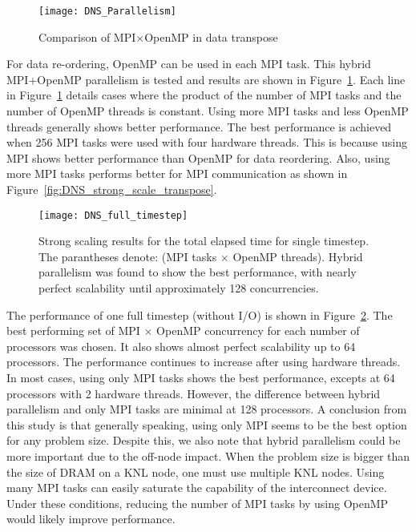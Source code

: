 \begin{figure}
 \begin{center}
   \texttt{[image: DNS\_Parallelism]}
   \caption{Comparison of MPI$\times$OpenMP in data transpose}
   \label{fig:DNS_MPI_OpenMP}
 \end{center}
\end{figure}


For data re-ordering, OpenMP can be used in each MPI task. This hybrid MPI+OpenMP parallelism
is tested and results are shown in Figure~\ref{fig:DNS_MPI_OpenMP}.
Each line in Figure~\ref{fig:DNS_MPI_OpenMP} details cases where the product of
the number of MPI tasks and the number of OpenMP threads is
constant. Using more MPI tasks and less OpenMP threads generally shows
better performance. The best performance is achieved when 256 MPI tasks
were used with four hardware threads. This is because using MPI shows
better performance than OpenMP for data reordering. Also, using more MPI
tasks performs better for MPI communication as shown in
Figure~\ref{fig:DNS_strong_scale_transpose}.


\begin{figure}
 \begin{center}
   \texttt{[image: DNS\_full\_timestep]}
   \caption{Strong scaling results for the total elapsed time for single timestep. The parantheses denote: (MPI tasks $\times$ OpenMP threads). Hybrid parallelism was found to show the best performance, with nearly perfect scalability until approximately 128 concurrencies.}
   \label{fig:DNS_strong_scale_total_elapsed_time}
 \end{center}
\end{figure}

The performance of one full timestep (without I/O) is shown in
Figure~\ref{fig:DNS_strong_scale_total_elapsed_time}. The best
performing set of MPI $\times$ OpenMP concurrency for each number of
processors was chosen. It also shows almost perfect scalability up to 64
processors. The performance continues to increase after using hardware
threads. In most cases, using only MPI tasks shows the best performance,
excepts at 64 processors with 2 hardware threads. However, the
difference between hybrid parallelism and only MPI tasks are minimal at
128 processors. A conclusion from this study is that generally speaking,
using only MPI seems to be the best option for any problem size.
Despite this, we also note that hybrid parallelism could be more
important due to the off-node impact. When the problem size
is bigger than the size of DRAM on a KNL node, one must use multiple KNL
nodes. Using many MPI tasks can easily saturate the capability of
the interconnect device. Under these conditions, reducing the number of MPI tasks
by using OpenMP would likely improve performance.

